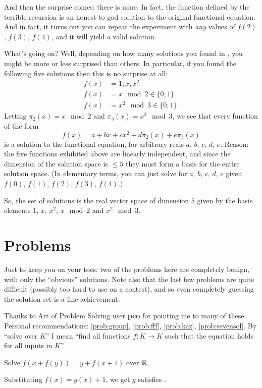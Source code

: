 \documentclass[11pt]{scrartcl}
\begin{document}
And then the surprise comes: there is none.
In fact, the function defined by the terrible recursion
is an honest-to-god solution to the original functional equation.
And in fact, it turns out you can repeat the experiment with \emph{any} values of
$f(2)$, $f(3)$, $f(4)$, and it will yield a valid solution.

What's going on?
Well, depending on how many solutions you found in ,
you might be more or less surprised than others.
In particular, if you found the following five solutions then
this is no surprise at all:
\begin{align*}
  f(x) &= 1, x, x^2 \\
  f(x) &= x \mod 2 \in \{0,1\}\\
  f(x) &= x^2 \mod 3 \in \{0,1\}.
\end{align*}
Letting $\pi_2(x) = x \mod 2$ and $\pi_3(x) = x^2 \mod 3$, we see that
every function of the form
\[ f(x) = a + bx + cx^2 + d\pi_2(x) + e\pi_3(x) \]
is a solution to the functional equation,
for arbitrary reals $a$, $b$, $c$, $d$, $e$.
Reason: the five functions exhibited above are linearly independent,
and since the dimension of the solution space is $\le 5$
they must form a basis for the entire solution space.
(In elementary terms, you can just solve for $a$, $b$, $c$, $d$, $e$
given $f(0)$, $f(1)$, $f(2)$, $f(3)$, $f(4)$.)

So, the set of solutions is the real vector space of dimension $5$
given by the basis elements $1$, $x$, $x^2$, $x \mod 2$ and $x^2 \mod 3$.

\section{Problems}
Just to keep you on your toes: two of the problems here are completely benign,
with only the ``obvious'' solutions.
Note also that the last few problems are quite difficult (possibly too hard to use on a contest),
and so even completely guessing the solution set is a fine achievement.

Thanks to Art of Problem Solving user \textbf{pco} for pointing me to many of these.
Personal recommendations:
\ref{prob:group}, \ref{prob:fff}, \ref{prob:kaz}, \ref{prob:sevensol}.
By ``solve over $K$'' I mean ``find all functions $f \colon K \to K$
such that the equation holds for all inputs in $K$''.

\begin{problem}
  Solve $f(x+f(y))=y+f(x+1)$ over $\mathbb R$.
  \begin{hint}
    Substituting $f(x) = g(x) + 1$, we get $g$ satisfies .
  \end{hint}
\end{problem}
\end{document}
